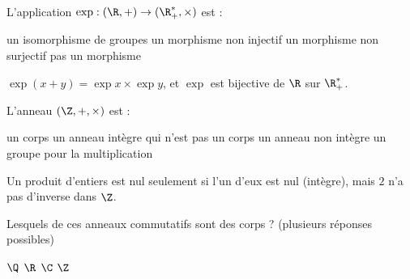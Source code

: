 \begin{question}
L'application $\exp:(\R,+)\to(\R_+^*,\times)$ est :
\begin{reponses}
  \bonne un isomorphisme de groupes
  \mauvaise un morphisme non injectif
  \mauvaise un morphisme non surjectif
  \mauvaise pas un morphisme
\end{reponses}
\begin{explication}
$\exp(x+y)=\exp x\times\exp y$, et $\exp$ est bijective de $\R$ sur $\R_+^*$.
\end{explication}
\end{question}

\begin{question}
L'anneau $(\Z,+,\times)$ est :
\begin{reponses}
  \mauvaise un corps
  \bonne un anneau intègre qui n'est pas un corps
  \mauvaise un anneau non intègre
  \mauvaise un groupe pour la multiplication
\end{reponses}
\begin{explication}
Un produit d'entiers est nul seulement si l'un d'eux est nul (intègre), mais $2$ n'a pas d'inverse dans $\Z$.
\end{explication}
\end{question}

\begin{question}
Lesquels de ces anneaux commutatifs sont des corps ? (plusieurs réponses possibles)
\begin{reponses}
  \bonne $\Q$
  \bonne $\R$
  \bonne $\C$
  \mauvaise $\Z$
\end{reponses}
\end{question}
